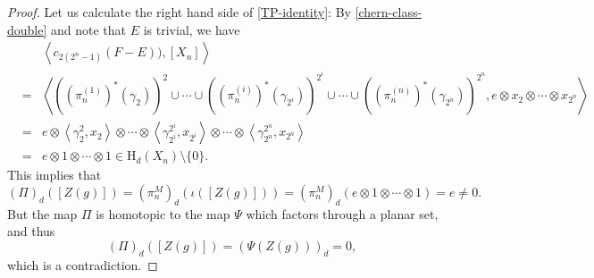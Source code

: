 \documentclass[12pt, oneside, psamsfonts]{amsart}
\newtheorem{lem}[thm]{Lemma}
\theoremstyle{definition}
\theoremstyle{remark}
\numberwithin{equation}{section}
\begin{document}
\begin{proof}
Let us calculate the right hand side of \eqref{TP-identity}: By \eqref{chern-class-double} and note that $E$ is trivial, we have 
\begin{eqnarray}\label{comp-right}
&& \left< c_{2(2^n-1)}(F - E)), [X_{n}] \right> \nonumber  \\
& = & \left<  ((\pi_{n}^{(1)})^*(\gamma_2))^2 \cup \cdots \cup ((\pi_{n}^{(i)})^*(\gamma_{2^{i}}))^{2^{i}} \cup \cdots \cup ((\pi_{n}^{(n)})^*(\gamma_{2^{n}}))^{2^{n}}, e \otimes x_{2} \otimes \cdots \otimes x_{2^{n}} \right> \nonumber \\
& = &e \otimes \left<\gamma^2_2, x_2 \right> \otimes \cdots \otimes \left< \gamma_{2^{i}}^{2^{i}}, x_{2^{i}}\right> \otimes \cdots \otimes \left< \gamma_{2^{n}}^{2^{n}}, x_{2^{n}}\right> \nonumber \\
& = & e \otimes 1 \otimes \cdots \otimes 1 \in \mathrm{H}_{d}(X_n) \setminus\{0\}. 
\nonumber
\end{eqnarray}
This implies that %
$$(\Pi)_d([Z(g)]) = (\pi_{n}^M)_d(\iota([Z(g)])) = (\pi_{n}^M)_d(e \otimes 1\otimes \cdots \otimes 1) = e \neq 0.$$
But the map $\Pi$ is homotopic to the map $\Psi$ which factors through a planar set, and thus $$(\Pi)_{d}([Z(g)]) = (\Psi(Z(g)))_{d} = 0, $$ which is a contradiction.

%
%
%
%
%
%
%
%
%
%


\end{proof}
\end{document}
